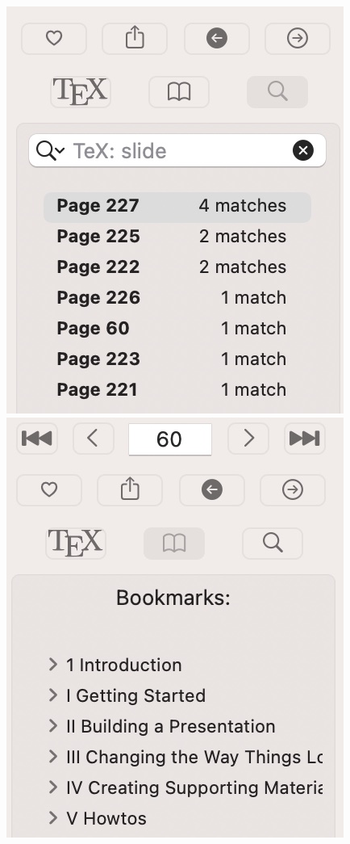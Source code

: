 \documentclass[11pt,a4paper]{article}
\begin{document}
\includegraphics[scale=0.2]{TeXCommandSearch.jpg} \includegraphics[scale=0.2]{Bookmarks.jpg}
\end{document}
